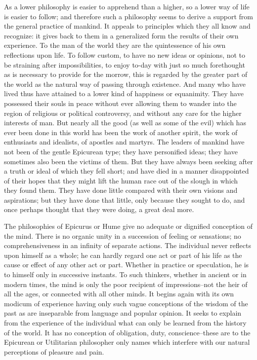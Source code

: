 As a lower philosophy is easier to apprehend than a higher, so a lower
way of life is easier to follow; and therefore such a philosophy seems
to derive a support from the general practice of mankind. It appeals to
principles which they all know and recognize: it gives back to them in a
generalized form the results of their own experience. To the man of the
world they are the quintessence of his own reflections upon life. To
follow custom, to have no new ideas or opinions, not to be straining
after impossibilities, to enjoy to-day with just so much forethought as
is necessary to provide for the morrow, this is regarded by the greater
part of the world as the natural way of passing through existence. And
many who have lived thus have attained to a lower kind of happiness
or equanimity. They have possessed their souls in peace without ever
allowing them to wander into the region of religious or political
controversy, and without any care for the higher interests of man. But
nearly all the good (as well as some of the evil) which has ever been
done in this world has been the work of another spirit, the work of
enthusiasts and idealists, of apostles and martyrs. The leaders
of mankind have not been of the gentle Epicurean type; they have
personified ideas; they have sometimes also been the victims of them.
But they have always been seeking after a truth or ideal of which they
fell short; and have died in a manner disappointed of their hopes that
they might lift the human race out of the slough in which they found
them. They have done little compared with their own visions and
aspirations; but they have done that little, only because they sought to
do, and once perhaps thought that they were doing, a great deal more.

The philosophies of Epicurus or Hume give no adequate or dignified
conception of the mind. There is no organic unity in a succession of
feeling or sensations; no comprehensiveness in an infinity of separate
actions. The individual never reflects upon himself as a whole; he can
hardly regard one act or part of his life as the cause or effect of any
other act or part. Whether in practice or speculation, he is to himself
only in successive instants. To such thinkers, whether in ancient or in
modern times, the mind is only the poor recipient of impressions--not
the heir of all the ages, or connected with all other minds. It
begins again with its own modicum of experience having only such vague
conceptions of the wisdom of the past as are inseparable from language
and popular opinion. It seeks to explain from the experience of the
individual what can only be learned from the history of the world. It
has no conception of obligation, duty, conscience--these are to the
Epicurean or Utilitarian philosopher only names which interfere with our
natural perceptions of pleasure and pain.

